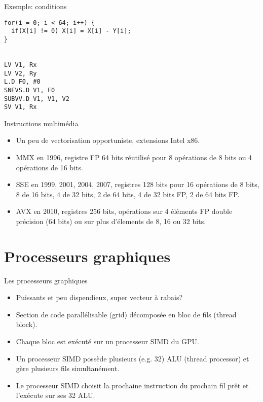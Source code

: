 \documentclass[10pt]{beamer}
\begin{document}
\begin{frame}[fragile]{Exemple: conditions}

  \begin{verbatim}
for(i = 0; i < 64; i++) {
  if(X[i] != 0) X[i] = X[i] - Y[i];
}


LV V1, Rx
LV V2, Ry
L.D F0, #0
SNEVS.D V1, F0
SUBVV.D V1, V1, V2
SV V1, Rx
  \end{verbatim}
\end{frame}

\begin{frame}{Instructions multimédia}

  \begin{itemize}
    \item Un peu de vectorisation opportuniste, extensions Intel x86.

    \item MMX en 1996, registre FP 64 bits réutilisé pour 8 opérations de 8 bits ou 4 opérations de 16 bits.

    \item SSE en 1999, 2001, 2004, 2007, registres 128 bits pour 16 opérations de 8 bits, 8 de 16 bits, 4 de 32 bits, 2 de 64 bits, 4 de 32 bits FP, 2 de 64 bits FP.

    \item AVX en 2010, registres 256 bits, opérations sur 4 éléments FP double précision (64 bits) ou sur plus d'élements de 8, 16 ou 32 bits.
  \end{itemize}
\end{frame}

\section{Processeurs graphiques}

\begin{frame}{Les processeurs graphiques}

  \begin{itemize}
    \item Puissants et peu dispendieux, super vecteur à rabais?

    \item Section de code parallélisable (grid) décomposée en bloc de fils (thread block).

    \item Chaque bloc est exécuté sur un processeur SIMD du GPU.

    \item Un processeur SIMD possède plusieurs (e.g. 32) ALU (thread processor) et gère plusieurs fils simultanément.

    \item Le processeur SIMD choisit la prochaine instruction du prochain fil prêt et l'exécute sur ses 32 ALU.
  \end{itemize}
\end{frame}
\end{document}
